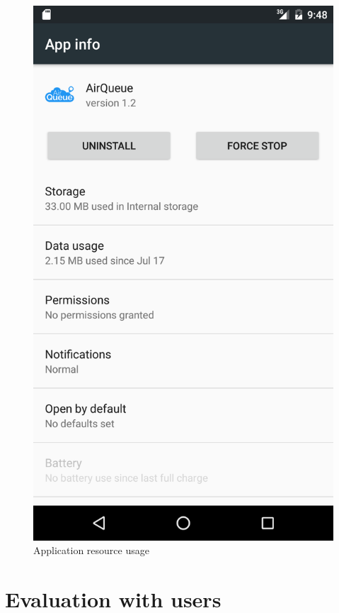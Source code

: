 \begin{figure}[H]
\begin{adjustbox}{width=.45\textwidth,center=\textwidth}
  \centering
  \includegraphics[scale=1]{images/resource_usage.png}
\end{adjustbox}
  \caption[Application resource usage]{Application resource usage}
  \label{fig:automated_tests}
\end{figure}


\section{Evaluation with users}

